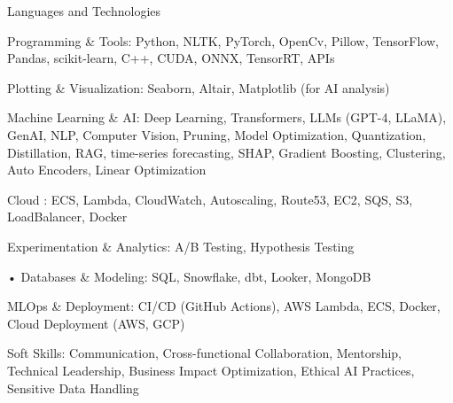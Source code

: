 

\begin{cventries}

  \cventry
    {Languages and Technologies}
    {}
    {}
    {}
    {
     \begin{cvitems} %
      \item {Programming \& Tools: Python, NLTK, PyTorch, OpenCv, Pillow, TensorFlow, Pandas, 
        scikit-learn, C++, CUDA, ONNX, TensorRT, APIs}	
      \item {Plotting \& Visualization: Seaborn, Altair, Matplotlib (for AI analysis)}
      \item {Machine Learning \& AI: Deep Learning, Transformers, LLMs (GPT-4, LLaMA), GenAI, NLP, 
        Computer Vision, Pruning, Model Optimization, Quantization, 
        Distillation, RAG, time-series forecasting, SHAP, Gradient Boosting, Clustering, Auto Encoders, 
        Linear Optimization}	
      \item {Cloud : ECS, Lambda, CloudWatch, Autoscaling, Route53, EC2, SQS, S3, LoadBalancer, Docker}
      \item {Experimentation \& Analytics:  A/B Testing, Hypothesis Testing}
	    \item {• Databases \& Modeling: SQL, Snowflake, dbt, Looker, MongoDB}
      \item {MLOps \& Deployment: CI/CD (GitHub Actions), AWS Lambda, ECS, Docker, Cloud Deployment (AWS, GCP)}
      \item {Soft Skills: Communication, Cross-functional Collaboration, Mentorship, Technical Leadership, 
      Business Impact Optimization, Ethical AI Practices, Sensitive Data Handling}
     \end{cvitems}
    }

\end{cventries}
